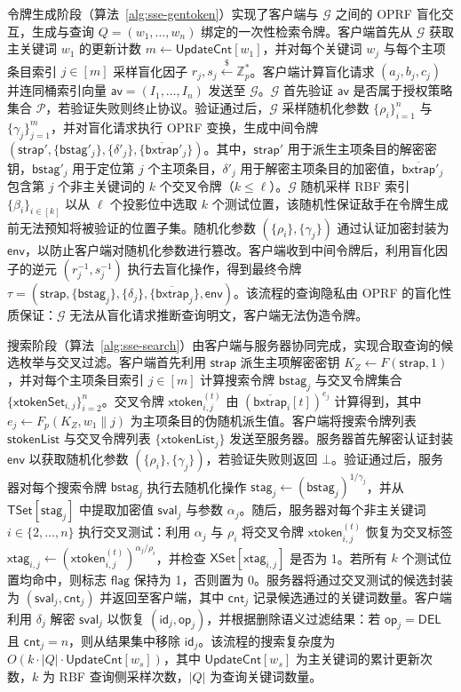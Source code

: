 令牌生成阶段（算法~\ref{alg:sse-gentoken}）实现了客户端与 $\mathcal{G}$ 之间的 OPRF 盲化交互，生成与查询 $Q=(w_1,\ldots,w_n)$ 绑定的一次性检索令牌。客户端首先从 $\mathcal{G}$ 获取主关键词 $w_1$ 的更新计数 $m\leftarrow\mathsf{UpdateCnt}[w_1]$，并对每个关键词 $w_j$ 与每个主项条目索引 $j\in[m]$ 采样盲化因子 $r_j,s_j\xleftarrow{\$}\mathbb{Z}_p^*$。客户端计算盲化请求 $(a_j,b_j,c_j)$ 并连同桶索引向量 $\mathsf{av}=(I_1,\ldots,I_n)$ 发送至 $\mathcal{G}$。$\mathcal{G}$ 首先验证 $\mathsf{av}$ 是否属于授权策略集合 $\mathcal{P}$，若验证失败则终止协议。验证通过后，$\mathcal{G}$ 采样随机化参数 $\{\rho_i\}_{i=1}^{n}$ 与 $\{\gamma_j\}_{j=1}^{m}$，并对盲化请求执行 OPRF 变换，生成中间令牌 $(\mathsf{strap}',\{\mathsf{bstag}'_j\},\{\delta'_j\},\{\overline{\mathsf{bxtrap}}'_j\})$。其中，$\mathsf{strap}'$ 用于派生主项条目的解密密钥，$\mathsf{bstag}'_j$ 用于定位第 $j$ 个主项条目，$\delta'_j$ 用于解密主项条目的加密值，$\overline{\mathsf{bxtrap}}'_j$ 包含第 $j$ 个非主关键词的 $k$ 个交叉令牌（$k\le\ell$）。$\mathcal{G}$ 随机采样 RBF 索引 $\{\beta_i\}_{i\in[k]}$ 以从 $\ell$ 个投影位中选取 $k$ 个测试位置，该随机性保证敌手在令牌生成前无法预知将被验证的位置子集。随机化参数 $(\{\rho_i\},\{\gamma_j\})$ 通过认证加密封装为 $\mathsf{env}$，以防止客户端对随机化参数进行篡改。客户端收到中间令牌后，利用盲化因子的逆元 $(r_j^{-1},s_j^{-1})$ 执行去盲化操作，得到最终令牌 $\tau=(\mathsf{strap},\{\mathsf{bstag}_j\},\{\delta_j\},\{\overline{\mathsf{bxtrap}}_j\},\mathsf{env})$。该流程的查询隐私由 OPRF 的盲化性质保证：$\mathcal{G}$ 无法从盲化请求推断查询明文，客户端无法伪造令牌。

搜索阶段（算法~\ref{alg:sse-search}）由客户端与服务器协同完成，实现合取查询的候选枚举与交叉过滤。客户端首先利用 $\mathsf{strap}$ 派生主项解密密钥 $K_Z\leftarrow F(\mathsf{strap},1)$，并对每个主项条目索引 $j\in[m]$ 计算搜索令牌 $\mathsf{bstag}_j$ 与交叉令牌集合 $\{\mathsf{xtokenSet}_{i,j}\}_{i=2}^{n}$。交叉令牌 $\mathsf{xtoken}_{i,j}^{(t)}$ 由 $(\overline{\mathsf{bxtrap}}_i[t])^{e_j}$ 计算得到，其中 $e_j\leftarrow F_p(K_Z,w_1\|j)$ 为主项条目的伪随机派生值。客户端将搜索令牌列表 $\mathsf{stokenList}$ 与交叉令牌列表 $\{\mathsf{xtokenList}_j\}$ 发送至服务器。服务器首先解密认证封装 $\mathsf{env}$ 以获取随机化参数 $(\{\rho_i\},\{\gamma_j\})$，若验证失败则返回 $\bot$。验证通过后，服务器对每个搜索令牌 $\mathsf{bstag}_j$ 执行去随机化操作 $\mathsf{stag}_j\leftarrow(\mathsf{bstag}_j)^{1/\gamma_j}$，并从 $\mathsf{TSet}[\mathsf{stag}_j]$ 中提取加密值 $\mathsf{sval}_j$ 与参数 $\alpha_j$。随后，服务器对每个非主关键词 $i\in\{2,\ldots,n\}$ 执行交叉测试：利用 $\alpha_j$ 与 $\rho_i$ 将交叉令牌 $\mathsf{xtoken}_{i,j}^{(t)}$ 恢复为交叉标签 $\mathsf{xtag}_{i,j}\leftarrow(\mathsf{xtoken}_{i,j}^{(t)})^{\alpha_j/\rho_i}$，并检查 $\mathsf{XSet}[\mathsf{xtag}_{i,j}]$ 是否为 1。若所有 $k$ 个测试位置均命中，则标志 $\mathsf{flag}$ 保持为 1，否则置为 0。服务器将通过交叉测试的候选封装为 $(\mathsf{sval}_j,\mathsf{cnt}_j)$ 并返回至客户端，其中 $\mathsf{cnt}_j$ 记录候选通过的关键词数量。客户端利用 $\delta_j$ 解密 $\mathsf{sval}_j$ 以恢复 $(\mathsf{id}_j,\mathsf{op}_j)$，并根据删除语义过滤结果：若 $\mathsf{op}_j=\mathsf{DEL}$ 且 $\mathsf{cnt}_j=n$，则从结果集中移除 $\mathsf{id}_j$。该流程的搜索复杂度为 $O(k\cdot|Q|\cdot\mathsf{UpdateCnt}[w_s])$，其中 $\mathsf{UpdateCnt}[w_s]$ 为主关键词的累计更新次数，$k$ 为 RBF 查询侧采样次数，$|Q|$ 为查询关键词数量。

